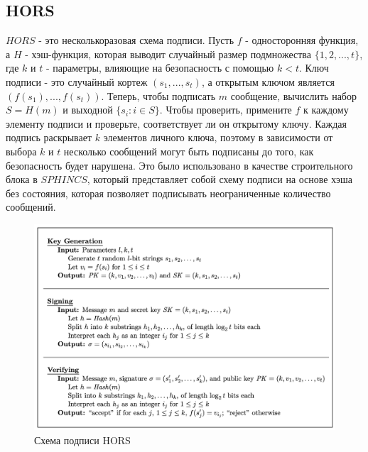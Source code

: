 \documentclass[a4paper, 14pt]{extarticle}
\begin{document}
\subsection{HORS}
$HORS$ - это несколькоразовая схема подписи. Пусть $f$ - односторонняя функция, а $H$ - хэш-функция, которая выводит случайный размер подмножества $\{1,2,...,t\}$, где $k$ и $t$ - параметры, влияющие на безопасность с помощью $k < t$. Ключ подписи - это случайный кортеж $(s_1,...,s_t)$, а открытым ключом является $(f(s_{1}),..., f(s_{t}))$. 
Теперь, чтобы подписать $m$ сообщение, вычислить набор $S = H(m)$ и выходной $\{s_{i} : i \in S\}$. Чтобы проверить, примените $f$ к каждому элементу подписи и проверьте, соответствует ли он открытому ключу. Каждая подпись раскрывает $k$ элементов личного ключа, поэтому в зависимости от выбора $k$ и $t$ несколько сообщений могут быть подписаны до того, как безопасность будет нарушена. Это было использовано в качестве строительного блока в $SPHINCS$, который представляет собой схему подписи на основе хэша без состояния, которая позволяет подписывать неограниченные количество сообщений.

\begin{figure}[h]
    \centering
    \includegraphics[scale=0.62]{HORS.png}
    \caption{Схема подписи HORS}
    \label{fig:hors}
\end{figure}
\end{document}
